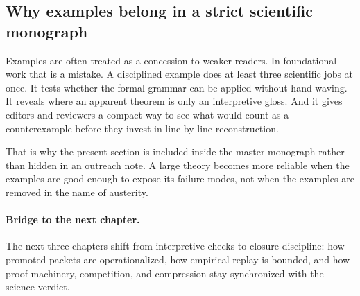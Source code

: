 \subsection{Why examples belong in a strict scientific monograph}

Examples are often treated as a concession to weaker readers. In foundational work that is a
mistake. A disciplined example does at least three scientific jobs at once. It tests whether the
formal grammar can be applied without hand-waving. It reveals where an apparent theorem is only an
interpretive gloss. And it gives editors and reviewers a compact way to see what would count as a
counterexample before they invest in line-by-line reconstruction.

That is why the present section is included inside the master monograph rather than hidden in an
outreach note. A large theory becomes more reliable when the examples are good enough to expose
its failure modes, not when the examples are removed in the name of austerity.

\paragraph{Bridge to the next chapter.}
The next three chapters shift from interpretive checks to closure discipline:
how promoted packets are operationalized, how empirical replay is bounded, and
how proof machinery, competition, and compression stay synchronized with the
science verdict.

\clearpage
